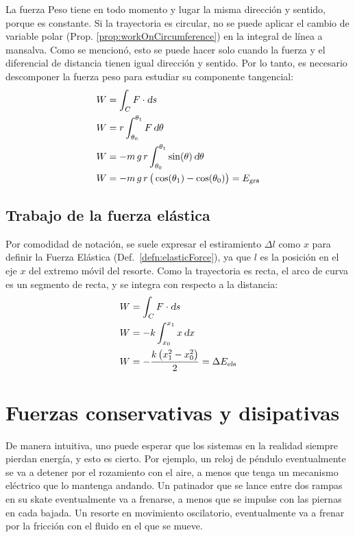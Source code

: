 \documentclass[a5paper,12pt,twoside]{book}
\begin{document}
La fuerza Peso tiene en todo momento y lugar la misma dirección y sentido, porque es constante. Si la trayectoria es circular, no se puede aplicar el cambio de variable polar (Prop. \ref{prop:workOnCircumference}) en la integral de línea a mansalva. Como se mencionó, esto se puede hacer solo cuando la fuerza y el diferencial de distancia tienen igual dirección y sentido. Por lo tanto, es necesario descomponer la fuerza peso para estudiar su componente tangencial:
\begin{align*}
    W &= \int_C F \cdot \textsl{d} s
    \\
    W &= r \int_{\theta_0}^{\theta_1} F \, \textsl{d} \theta
    \\
    W &= - m \, g \, r \int_{\theta_0}^{\theta_1} \sin(\theta)  \, \textsl{d} \theta
    \\
    W &= - m \, g \, r \, \big( \cos(\theta_1) - \cos(\theta_0) \big)
    = {{E}_\textsl{{gra}}}
\end{align*}


\subsection{Trabajo de la fuerza elástica}

Por comodidad de notación, se suele expresar el estiramiento $\Delta l$ como $x$ para definir la Fuerza Elástica (Def.\ \ref{defn:elasticForce}), ya que $l$ es la posición en el eje $x$ del extremo móvil del resorte. Como la trayectoria es recta, el arco de curva es un segmento de recta, y se integra con respecto a la distancia:
\begin{align*}
    W &= \int_C F \cdot \textsl{d} s
    \\
    W &= - k \int_{x_0}^{x_1} x \, \textsl{d} x
    \\
    W &= - \frac{k \left(x_1^2 - x_0^2\right)}{2} = \Delta {{E}_\textsl{{ela}}}
\end{align*}


\section{Fuerzas conservativas y disipativas}

De manera intuitiva, uno puede esperar que los sistemas en la realidad siempre pierdan energía, y esto es cierto. Por ejemplo, un reloj de péndulo eventualmente se va a detener por el rozamiento con el aire, a menos que tenga un mecanismo eléctrico que lo mantenga andando. Un patinador que se lance entre dos rampas en su skate eventualmente va a frenarse, a menos que se impulse con las piernas en cada bajada. Un resorte en movimiento oscilatorio, eventualmente va a frenar por la fricción con el fluido en el que se mueve.
\end{document}
